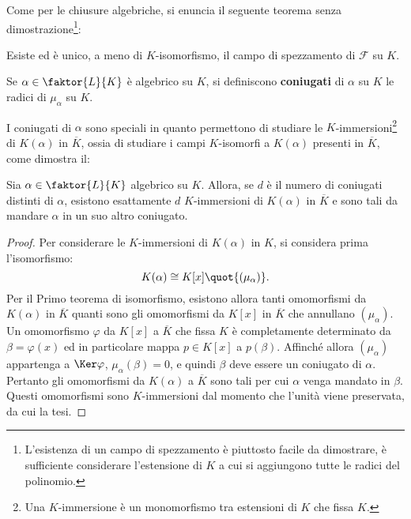 \documentclass[12pt]{scrartcl}
\begin{document}
	Come per le chiusure algebriche, si enuncia il seguente
	teorema senza dimostrazione\footnote{
		L'esistenza di un campo di spezzamento è piuttosto
		facile da dimostrare, è sufficiente considerare
		l'estensione di $K$ a cui si aggiungono tutte le
		radici del polinomio.
	}:
	
	\begin{theorem}
		Esiste ed è unico, a meno di $K$-isomorfismo, il
		campo di spezzamento di $\mathcal{F}$ su $K$.
	\end{theorem}
	
	\begin{definition}
		Se $\alpha \in \faktor{L}{K}$ è algebrico su $K$, si definiscono \textbf{coniugati} di $\alpha$ su $K$ le
		radici di $\mu_\alpha$ su $K$.
	\end{definition}
	
	I coniugati di $\alpha$ sono speciali in quanto
	permettono di studiare
	le $K$-immersioni\footnote{
		Una $K$-immersione è un monomorfismo tra estensioni di $K$
		che fissa $K$.
	} di $K(\alpha)$ in $\overline{K}$, ossia
	di studiare i campi $K$-isomorfi a $K(\alpha)$ presenti in
	$\overline{K}$, come dimostra il:
	
	\begin{theorem}
		Sia $\alpha \in \faktor{L}{K}$ algebrico su $K$. Allora,
		se $d$ è il numero di coniugati distinti di $\alpha$,
		esistono esattamente $d$ $K$-immersioni di $K(\alpha)$
		in $\overline{K}$ e sono tali da mandare $\alpha$ in
		un suo altro coniugato.
	\end{theorem}
	
	\begin{proof}
		Per considerare le $K$-immersioni di $K(\alpha)$ in
		$K$, si considera prima l'isomorfismo:
		\[ K(\alpha) \cong K[x] \quot{(\mu_\alpha)}. \]
		Per il Primo teorema di isomorfismo, esistono
		allora tanti omomorfismi da $K(\alpha)$ in $\overline{K}$
		quanti sono gli omomorfismi da $K[x]$ in $\overline{K}$ che
		annullano $(\mu_\alpha)$. Un omomorfismo $\varphi$
		da $K[x]$ a $\overline{K}$ che fissa $K$ è completamente determinato da
		$\beta = \varphi(x)$ ed in particolare mappa $p \in K[x]$
		a $p(\beta)$. Affinché allora $(\mu_\alpha)$
		appartenga a $\Ker \varphi$, $\mu_\alpha(\beta) = 0$, e quindi
		$\beta$ deve essere un coniugato di $\alpha$. Pertanto
		gli omomorfismi da $K(\alpha)$ a $\overline{K}$ sono
		tali per cui $\alpha$ venga mandato in $\beta$. Questi
		omomorfismi
		sono $K$-immersioni dal momento che l'unità viene preservata,
		da cui la tesi.
	\end{proof}
	
\end{document}
